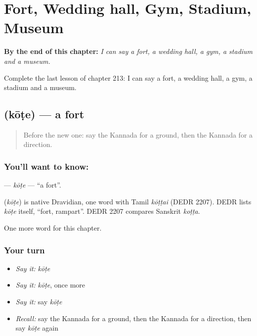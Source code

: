 
\chapter{Fort, Wedding hall, Gym, Stadium, Museum}
\label{ch:ka-fort-wedding-hall-gym-stadium-museum}

\begin{chapteropening}
\textbf{By the end of this chapter:} \emph{I can say a fort, a wedding hall, a gym, a stadium and a museum.}

Complete the last lesson of chapter 213: I can say a fort, a wedding hall, a gym, a stadium and a museum.
\end{chapteropening}

\section[\texorpdfstring{\kn{ಕೋಟೆ} (kōṭe)}{ಕೋಟೆ (kōṭe)}]{ (kōṭe) — a fort}

\label{lesson:KA-C213-kote}



\begin{quote}
Before the new one: say the Kannada for a ground, then the Kannada for a direction.
\end{quote}

\subsection*{You'll want to know: }
\textbf{} — \emph{kōṭe} — \textquotedblleft{}a fort\textquotedblright{}.

\begin{cousinweb}
\textbf{} (\emph{kōṭe}) is native Dravidian, one word with Tamil \emph{kōṭṭai} (DEDR 2207). DEDR lists \emph{kōṭe} itself, \textquotedblleft{}fort, rampart\textquotedblright{}. DEDR 2207 compares Sanskrit \emph{koṭṭa}.
\end{cousinweb}

\begin{grammarlens}[title={What you've built}]
One more word for this chapter.
\end{grammarlens}

\subsection*{Your turn}
\begin{itemize}
\raggedright
  \item \emph{Say it:} \emph{kōṭe}
  \item \emph{Say it:} \emph{kōṭe}, once more
  \item \emph{Say it:} say \emph{kōṭe}
  \item \emph{Recall:} say the Kannada for a ground, then the Kannada for a direction, then say \emph{kōṭe} again
\end{itemize}

